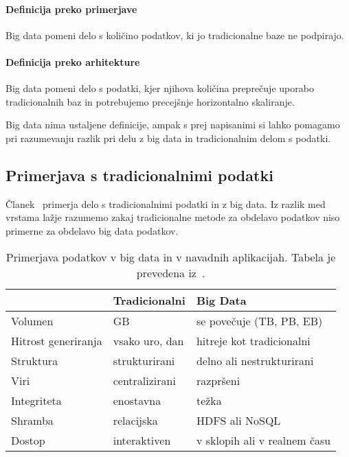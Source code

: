 \paragraph{Definicija preko primerjave}
Big data pomeni delo s količino podatkov, ki jo tradicionalne baze ne podpirajo.

\paragraph{Definicija preko arhitekture}
Big data pomeni delo s podatki, kjer njihova količina preprečuje uporabo
tradicionalnih baz in potrebujemo precejšnje horizontalno skaliranje.

\bigskip

\noindent Big data nima ustaljene definicije, ampak s prej napisanimi si lahko pomagamo pri razumevanju razlik
pri delu z big data in tradicionalnim delom s podatki.

\subsection{Primerjava s tradicionalnimi podatki}

Članek~\cite{toward_scalable_systems_big_data_analytics} primerja delo s tradicionalnimi podatki in z big data.
Iz razlik med vrstama lažje razumemo zakaj tradicionalne metode za obdelavo podatkov niso primerne za obdelavo big data podatkov.

\begin{table}[H]
\centering
\begin{tabular}{l l l} 
& Tradicionalni & Big Data \\
\hline
Volumen & GB & se povečuje (TB, PB, EB) \\
Hitrost generiranja & vsako uro, dan & hitreje kot tradicionalni \\
Struktura & strukturirani & delno ali nestrukturirani \\
Viri & centralizirani & razpršeni \\
Integriteta & enostavna & težka \\
Shramba & relacijska & HDFS ali NoSQL \\
Dostop & interaktiven & v sklopih ali v realnem času
\end{tabular}
\caption{Primerjava podatkov v big data in v navadnih aplikacijah. Tabela je prevedena iz~\cite{toward_scalable_systems_big_data_analytics}.}
\label{table:big-data-vs-normal}
\end{table}

